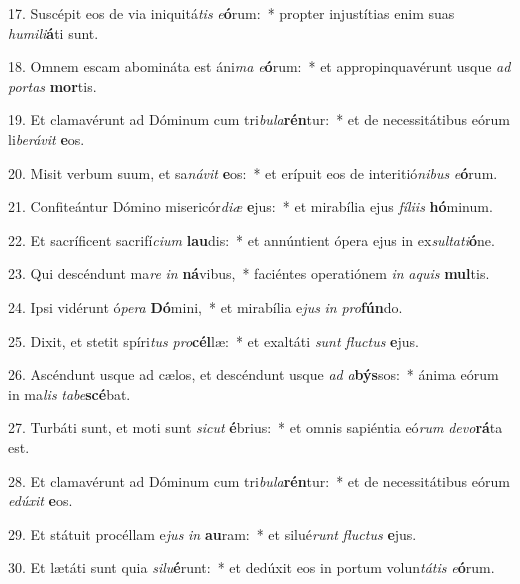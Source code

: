 17. Suscépit eos de via iniquitá\textit{tis} \textit{e}\textbf{ó}rum:~*  propter injustítias enim suas \textit{hu}\textit{mi}\textit{li}\textbf{á}ti sunt.\

18. Omnem escam abomináta est áni\textit{ma} \textit{e}\textbf{ó}rum:~*  et appropinquavérunt usque \textit{ad} \textit{por}\textit{tas} \textbf{mor}tis.\

19. Et clamavérunt ad Dóminum cum tri\textit{bu}\textit{la}\textbf{rén}tur:~*  et de necessitátibus eórum li\textit{be}\textit{rá}\textit{vit} \textbf{e}os.\

20. Misit verbum suum, et sa\textit{ná}\textit{vit} \textbf{e}os:~*  et erípuit eos de interitió\textit{ni}\textit{bus} \textit{e}\textbf{ó}rum.\

21. Confiteántur Dómino misericór\textit{di}\textit{æ} \textbf{e}jus:~*  et mirabília ejus \textit{fí}\textit{li}\textit{is} \textbf{hó}minum.\

22. Et sacríficent sacrifí\textit{ci}\textit{um} \textbf{lau}dis:~*  et annúntient ópera ejus in ex\textit{sul}\textit{ta}\textit{ti}\textbf{ó}ne.\

23. Qui descéndunt ma\textit{re} \textit{in} \textbf{ná}vibus,~*  faciéntes operatiónem \textit{in} \textit{a}\textit{quis} \textbf{mul}tis.\

24. Ipsi vidérunt ó\textit{pe}\textit{ra} \textbf{Dó}mini,~*  et mirabília e\textit{jus} \textit{in} \textit{pro}\textbf{fún}do.\

25. Dixit, et stetit spíri\textit{tus} \textit{pro}\textbf{cél}læ:~*  et exaltáti \textit{sunt} \textit{fluc}\textit{tus} \textbf{e}jus.\

26. Ascéndunt usque ad cælos, et descéndunt usque \textit{ad} \textit{a}\textbf{býs}sos:~*  ánima eórum in ma\textit{lis} \textit{ta}\textit{be}\textbf{scé}bat.\

27. Turbáti sunt, et moti sunt \textit{sic}\textit{ut} \textbf{é}brius:~*  et omnis sapiéntia eó\textit{rum} \textit{de}\textit{vo}\textbf{rá}ta est.\

28. Et clamavérunt ad Dóminum cum tri\textit{bu}\textit{la}\textbf{rén}tur:~*  et de necessitátibus eórum \textit{e}\textit{dú}\textit{xit} \textbf{e}os.\

29. Et státuit procéllam e\textit{jus} \textit{in} \textbf{au}ram:~*  et silué\textit{runt} \textit{fluc}\textit{tus} \textbf{e}jus.\

30. Et lætáti sunt quia \textit{si}\textit{lu}\textbf{é}runt:~*  et dedúxit eos in portum volun\textit{tá}\textit{tis} \textit{e}\textbf{ó}rum.\

